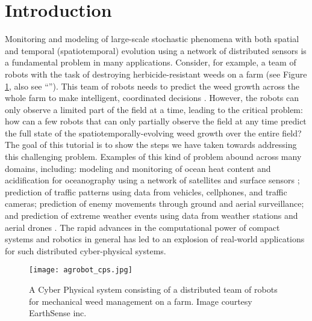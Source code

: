 \section{Introduction} \label{sec:intro}
Monitoring and modeling of large-scale stochastic phenomena with both spatial and temporal (spatiotemporal) evolution using a network of distributed sensors is a fundamental problem in many applications. Consider, for example, a team of robots with the task of destroying herbicide-resistant weeds on a farm (see Figure \ref{fig:cps}, also see ``''). This team of robots needs to predict the weed growth across the whole farm  to make intelligent, coordinated decisions \cite{McAllistar18IROS}. However, the robots can only observe a limited part of the field at a time, leading to  the critical problem: how can a few robots that can only partially observe the field at any time predict the full state of the spatiotemporally-evolving weed growth over the entire field? The goal of this tutorial is to show the steps we have taken towards addressing this challenging problem. Examples of this kind of problem abound across many domains, including: modeling and monitoring of ocean heat content and acidification for oceanography using a network of satellites and surface sensors \cite{barnett2001detection}; prediction of traffic patterns using data from vehicles, cellphones, and traffic cameras; prediction of enemy movements through ground and aerial surveillance; and prediction of extreme weather events  using data from weather stations and aerial drones \cite{heaton2011spatio}. The rapid advances in the computational power of compact systems and robotics in general has led to an explosion of real-world applications for such distributed cyber-physical systems. %
 
\begin{figure}[h] %
	\centering
	\texttt{[image: agrobot\_cps.jpg]}
		\caption{A Cyber Physical system consisting of a distributed team of robots for mechanical weed management on a farm. Image courtesy EarthSense inc.}
	\label{fig:cps}
\end{figure}



